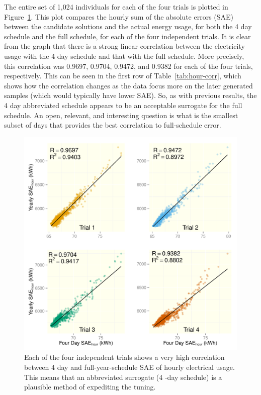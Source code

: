 \documentclass[preprint, review, 12pt]{elsarticle}
\begin{document}
The entire set of 1,024 individuals for each of the four trials is plotted in Figure~\ref{fig:hour-corr}. This plot compares the hourly sum of the absolute errors (SAE) between the candidate solutions and the actual energy usage, for both the 4 day schedule and the full schedule, for each of the four independent trials. It is clear from the graph that there is a strong linear correlation between the electricity usage with the 4 day schedule and that with the full schedule. More precisely, this correlation was 0.9697, 0.9704, 0.9472, and 0.9382 for each of the four trials, respectively. This can be seen in the first row of Table~\ref{tab:hour-corr}, which shows how the correlation changes as the data focus more on the later generated samples (which would typically have lower SAE). So, as with previous results, the 4 day abbreviated schedule appears to be an acceptable surrogate for the full schedule. An open, relevant, and interesting question is what is the smallest subset of days that provides the best correlation to full-schedule error.

\begin{figure}[htbp]
\centering
\includegraphics[width=5in]{graphics/figure1.pdf}
\caption{Each of the four independent trials shows a very high correlation between 4 day and full-year-schedule SAE of hourly electrical usage. This means that an abbreviated surrogate (4 -day schedule) is a plausible method of expediting the tuning.}
\label{fig:hour-corr}
\end{figure}
\end{document}
